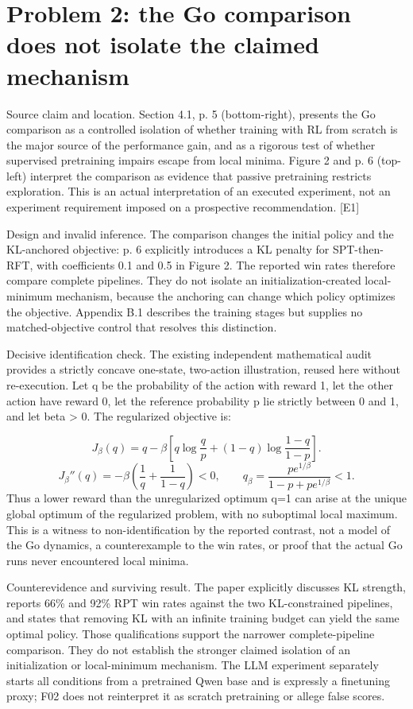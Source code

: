 \documentclass[10pt]{article}
\begin{document}
\section*{Problem 2: the Go comparison does not isolate the claimed mechanism}
Source claim and location. Section 4.1, p. 5 (bottom-right), presents the Go comparison as a controlled isolation of whether training with RL from scratch is the major source of the performance gain, and as a rigorous test of whether supervised pretraining impairs escape from local minima. Figure 2 and p. 6 (top-left) interpret the comparison as evidence that passive pretraining restricts exploration. This is an actual interpretation of an executed experiment, not an experiment requirement imposed on a prospective recommendation. [E1]\par
Design and invalid inference. The comparison changes the initial policy and the KL-anchored objective: p. 6 explicitly introduces a KL penalty for SPT-then-RFT, with coefficients 0.1 and 0.5 in Figure 2. The reported win rates therefore compare complete pipelines. They do not isolate an initialization-created local-minimum mechanism, because the anchoring can change which policy optimizes the objective. Appendix B.1 describes the training stages but supplies no matched-objective control that resolves this distinction.\par
Decisive identification check. The existing independent mathematical audit provides a strictly concave one-state, two-action illustration, reused here without re-execution. Let q be the probability of the action with reward 1, let the other action have reward 0, let the reference probability p lie strictly between 0 and 1, and let beta > 0. The regularized objective is:\par
\[J_\beta(q)=q-\beta\left[q\log\frac{q}{p}+(1-q)\log\frac{1-q}{1-p}\right].\] \[J_\beta''(q)=-\beta\!\left(\frac1q+\frac1{1-q}\right)<0,\qquad q_\beta=\frac{p e^{1/\beta}}{1-p+p e^{1/\beta}}<1.\] Thus a lower reward than the unregularized optimum q=1 can arise at the unique global optimum of the regularized problem, with no suboptimal local maximum. This is a witness to non-identification by the reported contrast, not a model of the Go dynamics, a counterexample to the win rates, or proof that the actual Go runs never encountered local minima.\par
Counterevidence and surviving result. The paper explicitly discusses KL strength, reports 66\% and 92\% RPT win rates against the two KL-constrained pipelines, and states that removing KL with an infinite training budget can yield the same optimal policy. Those qualifications support the narrower complete-pipeline comparison. They do not establish the stronger claimed isolation of an initialization or local-minimum mechanism. The LLM experiment separately starts all conditions from a pretrained Qwen base and is expressly a finetuning proxy; F02 does not reinterpret it as scratch pretraining or allege false scores.\par
\end{document}
